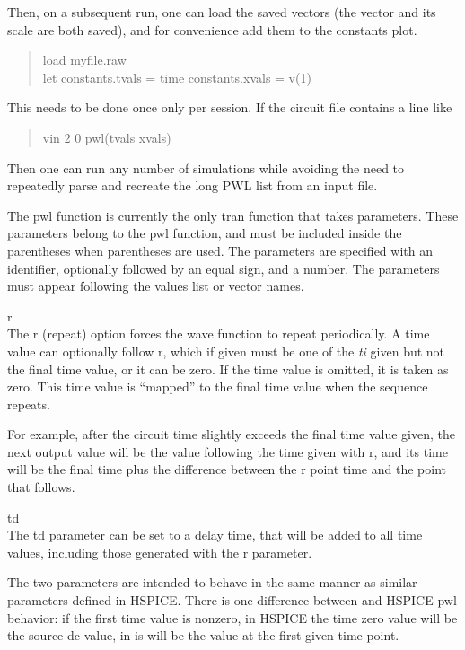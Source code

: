 Then, on a subsequent run, one can load the saved vectors (the vector
and its scale are both saved), and for convenience add them to the
{\vt constants} plot.

\begin{quote}\vt
load myfile.raw\\
let constants.tvals = time constants.xvals = v(1)
\end{quote}

This needs to be done once only per session.  If the circuit file
contains a line like

\begin{quote}\vt
vin 2 0 pwl(tvals xvals)
\end{quote}

Then one can run any number of simulations while avoiding the need to
repeatedly parse and recreate the long PWL list from an input file.

The {\vt pwl} function is currently the only tran function that takes
parameters.  These parameters belong to the {\vt pwl} function, and
must be included inside the parentheses when parentheses are used. 
The parameters are specified with an identifier, optionally followed
by an equal sign, and a number.  The parameters must appear following
the values list or vector names.

\begin{description}
\item{\vt r}\\
The {\vt r} (repeat) option forces the wave function to repeat
periodically.  A time value can optionally follow {\vt r}, which if
given must be one of the {\it ti} given but not the final time value,
or it can be zero.  If the time value is omitted, it is taken as zero. 
This time value is ``mapped'' to the final time value when the
sequence repeats.
 
For example, after the circuit time slightly exceeds the final time
value given, the next output value will be the value following the time
given with {\vt r}, and its time will be the final time plus the
difference between the {\vt r} point time and the point that follows.

\item{\vt td}\\
The {\vt td} parameter can be set to a delay time, that will be added
to all time values, including those generated with the {\vt r}
parameter.
\end{description}

The two parameters are intended to behave in the same manner as
similar parameters defined in HSPICE.  There is one difference between
{\WRspice} and HSPICE {\vt pwl} behavior:  if the first time value is
nonzero, in HSPICE the time zero value will be the source {\vt dc}
value, in {\WRspice} is will be the value at the first given time
point.
 
